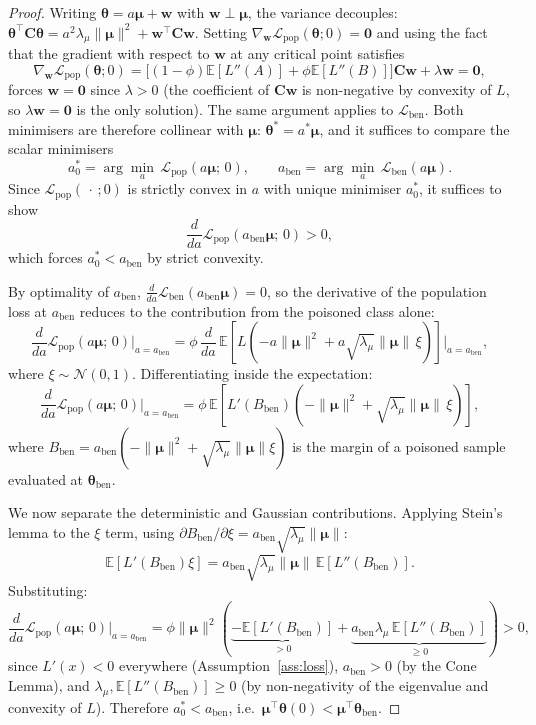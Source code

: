\documentclass[11pt]{article}
\newcommand{\EE}{\mathbb{E}}
\newcommand{\NN}{\mathcal{N}}
\newcommand{\C}{\mathbf{C}}
\newcommand{\bmu}{\boldsymbol{\mu}}
\newcommand{\btheta}{\boldsymbol{\theta}}
\begin{document}
\begin{proof}
Writing $\btheta = a\bmu + \mathbf{w}$ with $\mathbf{w} \perp \bmu$,
the variance decouples:
$\btheta^\top\C\btheta
= a^2\lambda_\mu\|\bmu\|^2 + \mathbf{w}^\top\C\mathbf{w}$.
Setting $\nabla_{\mathbf{w}}\mathcal{L}_{\mathrm{pop}}(\btheta;0)
= \mathbf{0}$ and using the fact that the gradient with respect to
$\mathbf{w}$ at any critical point satisfies
\[
\nabla_{\mathbf{w}}\mathcal{L}_{\mathrm{pop}}(\btheta;0)
= \bigl[(1-\phi)\EE[L''(A)] + \phi\EE[L''(B)]\bigr]\C\mathbf{w}
+ \lambda\mathbf{w} = \mathbf{0},
\]
forces $\mathbf{w} = \mathbf{0}$ since $\lambda > 0$
(the coefficient of $\C\mathbf{w}$ is non-negative by convexity of
$L$, so $\lambda\mathbf{w} = \mathbf{0}$ is the only solution).
The same argument applies to $\mathcal{L}_{\mathrm{ben}}$.
Both minimisers are therefore collinear with $\bmu$:
$\btheta^* = a^*\bmu$,
and it suffices to compare the scalar minimisers
\[
a_0^* = \arg\min_a\,\mathcal{L}_{\mathrm{pop}}(a\bmu;\,0),
\qquad
a_{\mathrm{ben}} = \arg\min_a\,\mathcal{L}_{\mathrm{ben}}(a\bmu).
\]
Since $\mathcal{L}_{\mathrm{pop}}(\,\cdot\,;0)$ is strictly convex
in $a$ with unique minimiser $a_0^*$, it suffices to show
\[
\frac{d}{da}\mathcal{L}_{\mathrm{pop}}(a_{\mathrm{ben}}\bmu;\,0) > 0,
\]
which forces $a_0^* < a_{\mathrm{ben}}$ by strict convexity.

By optimality of $a_{\mathrm{ben}}$,
$\frac{d}{da}\mathcal{L}_{\mathrm{ben}}(a_{\mathrm{ben}}\bmu) = 0$,
so the derivative of the population loss at $a_{\mathrm{ben}}$
reduces to the contribution from the poisoned class alone:
\[
\frac{d}{da}\mathcal{L}_{\mathrm{pop}}(a\bmu;\,0)\bigg|_{a=a_{\mathrm{ben}}}
= \phi\,\frac{d}{da}\,\EE\!\left[L\!\left(
  -a\|\bmu\|^2 + a\sqrt{\lambda_\mu}\|\bmu\|\,\xi
\right)\right]\bigg|_{a=a_{\mathrm{ben}}},
\]
where $\xi \sim \NN(0,1)$.
Differentiating inside the expectation:
\[
\frac{d}{da}\mathcal{L}_{\mathrm{pop}}(a\bmu;\,0)\bigg|_{a=a_{\mathrm{ben}}}
= \phi\,\EE\!\left[L'(B_{\mathrm{ben}})\left(-\|\bmu\|^2
+ \sqrt{\lambda_\mu}\|\bmu\|\,\xi\right)\right],
\]
where $B_{\mathrm{ben}} = a_{\mathrm{ben}}(-\|\bmu\|^2
+ \sqrt{\lambda_\mu}\|\bmu\|\xi)$ is the margin of a poisoned sample
evaluated at $\btheta_{\mathrm{ben}}$.

We now separate the deterministic and Gaussian contributions.
Applying Stein's lemma to the $\xi$ term, using
$\partial B_{\mathrm{ben}}/\partial\xi
= a_{\mathrm{ben}}\sqrt{\lambda_\mu}\|\bmu\|$:
\[
\EE[L'(B_{\mathrm{ben}})\xi]
= a_{\mathrm{ben}}\sqrt{\lambda_\mu}\|\bmu\|\,
\EE[L''(B_{\mathrm{ben}})].
\]
Substituting:
\[
\frac{d}{da}\mathcal{L}_{\mathrm{pop}}(a\bmu;\,0)\bigg|_{a=a_{\mathrm{ben}}}
= \phi\|\bmu\|^2\!\left(
\underbrace{-\EE[L'(B_{\mathrm{ben}})]}_{>0}
+ \underbrace{a_{\mathrm{ben}}\lambda_\mu\,
\EE[L''(B_{\mathrm{ben}})]}_{\geq 0}
\right) > 0,
\]
since $L'(x) < 0$ everywhere (Assumption~\ref{ass:loss}),
$a_{\mathrm{ben}} > 0$ (by the Cone Lemma), and
$\lambda_\mu, \EE[L''(B_{\mathrm{ben}})] \geq 0$
(by non-negativity of the eigenvalue and convexity of $L$).
Therefore $a_0^* < a_{\mathrm{ben}}$, i.e.\
$\bmu^\top\btheta(0) < \bmu^\top\btheta_{\mathrm{ben}}$.
\end{proof}
\end{document}

